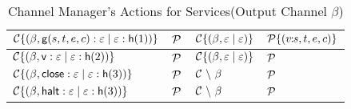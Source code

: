 \documentclass[11pt]{article}
\newcommand{\<}{\langle}
\renewcommand{\>}{\rangle}
\begin{document}
\begin{table}[!h]
\begin{center}
\begin{tabular}{|l|l||l|l|} \hline
${\cal C}\{ (\beta , {\sf g}(s,t,e,c):\varepsilon \mid \varepsilon :{\sf h}(1)) \}$ &  ${\cal P}$ & ${\cal C}\{ (\beta,\varepsilon \mid \varepsilon) \}$ & ${\cal P}\{(v\!\!:\!\! s,t,e,c)\}$ \\ \hline

${\cal C}\{ (\beta , {\sf v}:\varepsilon \mid \varepsilon :{\sf h}(2)) \}$ & ${\cal P}$ & ${\cal C}\{ (\beta,\varepsilon \mid \varepsilon) \}$ & ${\cal P}$\\ \hline

${\cal C}\{ (\beta , {\sf close}:\varepsilon \mid \varepsilon :{\sf h}(3)) \}$ & ${\cal P}$ & ${\cal C}~\backslash~\beta $ & ${\cal P}$ \\ \hline

${\cal C}\{ (\beta , {\sf halt}:\varepsilon \mid \varepsilon :{\sf h}(3)) \}$ & ${\cal P}$ & ${\cal C}~\backslash~\beta $ & ${\cal P}$ \\ \hline


\end{tabular}
\caption{Channel Manager's Actions for Services(Output Channel $\beta$)}
\label{channel-actions-Serv}
\end{center}
\end{table}
\end{document}
